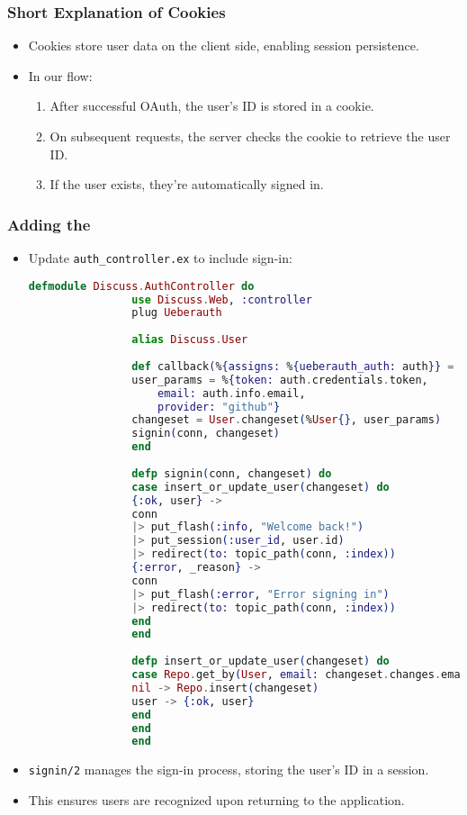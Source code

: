 \documentclass[aspectratio=169, table]{beamer}
\begin{document}
	\begin{frame}
		\frametitle{Short Explanation of Cookies}
		\begin{itemize}
			\item Cookies store user data on the client side, enabling session persistence.
			\item In our flow:
			\begin{enumerate}
				\item After successful OAuth, the user's ID is stored in a cookie.
				\item On subsequent requests, the server checks the cookie to retrieve the user ID.
				\item If the user exists, they're automatically signed in.
			\end{enumerate}
		\end{itemize}
	\end{frame}
	
	\begin{frame}[fragile]
		\frametitle{Adding the }
		\begin{itemize}
			\item Update \texttt{auth\_controller.ex} to include sign-in:
			\begin{lstlisting}[language=Elixir]
				defmodule Discuss.AuthController do
				use Discuss.Web, :controller
				plug Ueberauth
				
				alias Discuss.User
				
				def callback(%{assigns: %{ueberauth_auth: auth}} = conn, _params) do
				user_params = %{token: auth.credentials.token,
					email: auth.info.email,
					provider: "github"}
				changeset = User.changeset(%User{}, user_params)
				signin(conn, changeset)
				end
				
				defp signin(conn, changeset) do
				case insert_or_update_user(changeset) do
				{:ok, user} ->
				conn
				|> put_flash(:info, "Welcome back!")
				|> put_session(:user_id, user.id)
				|> redirect(to: topic_path(conn, :index))
				{:error, _reason} ->
				conn
				|> put_flash(:error, "Error signing in")
				|> redirect(to: topic_path(conn, :index))
				end
				end
				
				defp insert_or_update_user(changeset) do
				case Repo.get_by(User, email: changeset.changes.email) do
				nil -> Repo.insert(changeset)
				user -> {:ok, user}
				end
				end
				end
			\end{lstlisting}
			\item \texttt{signin/2} manages the sign-in process, storing the user's ID in a session.
			\item This ensures users are recognized upon returning to the application.
		\end{itemize}
	\end{frame}
	
\end{document}
